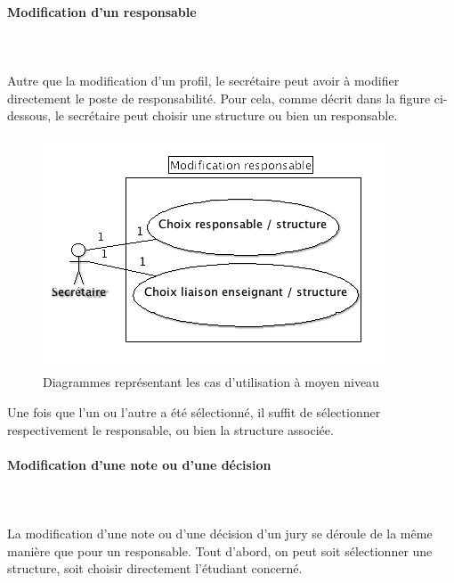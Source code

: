 \documentclass[letter, 11pt] {article}
\begin{document}
			\newpage
			\paragraph{Modification d'un responsable}~\paragraph{ }Autre que la modification d'un profil, le secrétaire peut avoir à modifier directement le poste de responsabilité. Pour cela, comme décrit dans la figure ci-dessous, le secrétaire peut choisir une structure ou bien un responsable. 
			
			\begin{figure}[!h]
				\centering
					\includegraphics[scale = 0.5]{../UseCase/UseCaseMoyenNiveau/ModificationResponsable.png}
				\caption{Diagrammes représentant les cas d'utilisation à moyen niveau}
			\end{figure}
			
			Une fois que l'un ou l'autre a été sélectionné, il suffit de sélectionner respectivement le responsable, ou bien la structure associée.
			
			\paragraph{Modification d'une note ou d'une décision}~	\paragraph{ } La modification d'une note ou d'une décision d'un jury se déroule de la même manière que pour un responsable. Tout d'abord, on peut soit sélectionner une structure, soit choisir directement l'étudiant concerné. 
			
\end{document}
